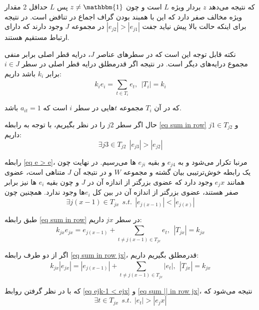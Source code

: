 که نتیجه می‌دهد $z$ بردار ویژه $L$ است و چون 
$z \ne \mathbbm{1}$
پس $L$ حداقل 2 مقدار ویژه مخالف صفر دارد که این با همبند بودن گراف اجماع در تناقض است. در نتیجه برای اینکه حالت بالا پیش نیاید جفت 
$|e_{j2}| > |e_{j1}|$
در مجموعه $J$ وجود دارند که دارای ارتباط مستقیم هستند.

نکته قابل توجه این است که در سطرهای عناصر $J$، درایه قطر اصلی برابر منفی مجموع درایه‌های دیگر است. در نتیجه اگر قدرمطلق درایه قطر اصلی در سطر $i \in J$ برابر $k_i$ باشد داریم:
\begin{equation}\label{eq sum in row}
	k_i e_{i} = \sum_{t \in T_i}^{}e_{t},~~ |T_i| = k_i
\end{equation}

که در آن $T_i$ مجموعه $t$هایی در سطر $i$ است که 
$a_{it} = 1$
باشد.

حال اگر سطر $j2$ را در نظر بگیریم، با توجه به رابطه \ref{eq sum in row} و 
$j1 \in T_{j2}$
داریم:
\begin{equation}\label{eq e > e}
\exists j3 \in T_{j2}~~|e_{j3}| > |e_{j2}|
\end{equation}

رابطه \ref{eq e > e}، مرنبا تکرار می‌شود و به $e_{j4}$ و بقیه $e_{ji}$ ها می‌رسیم. در نهایت چون یک رابطه خوش‌ترتیبی بیان گشته و مجموعه $W$ و در نتیجه آن $J$ متناهی است، عضوی همانند $e_jx$ وجود دارد که عضوی بزرگتر از اندازه آن در $J$ و چون بقیه‌ $e_i$ ها نیز برابر صفر هستند، عضوی بزرگتر از اندازه آن در بین کل $e_i$ها وجود ندارد. همچنین چون 
\begin{equation}\label{eq ejk-1 < ejx}
\exists j(x-1) \in T_{jx}~~s.t.~~|e_{j(x-1)}| < |e_{j(x)}|
\end{equation}

طبق رابطه \ref{eq sum in row} در سطر $jx$ داریم:
\begin{equation}\label{eq sum in row jx}
k_{jx} e_{jx} = e_{j(x-1)} + \sum_{t \ne j(x-1) \in T_{jx}}^{}e_{t},~~ |T_{jx}| = k_{jx}
\end{equation}

اگر از دو طرف رابطه \ref{eq sum in row jx}، قدرمطلق بگیریم داریم:
\begin{equation}\label{eq sum || in row jx}
k_{jx} |e_{jx}| = |e_{j(x-1)}| + \sum_{t \ne j(x-1) \in T_{jx}}^{}|e_{t}|,~~ |T_{jx}| = k_{jx}
\end{equation}

که با در نظر گرفتن روابط \ref{eq ejk-1 < ejx} و \ref{eq sum || in row jx}، نتیجه می‌شود که 
\begin{equation}
\exists t \in T_{jx}~~s.t.~~|e_t|>|e_jx|
\end{equation}

